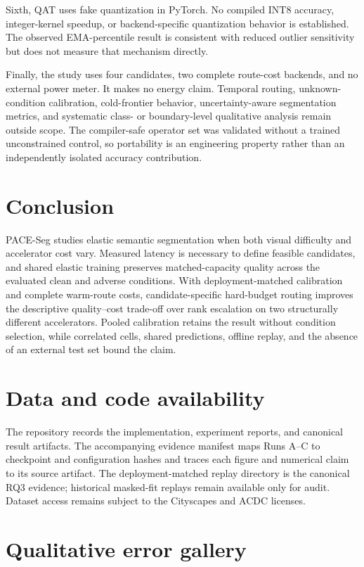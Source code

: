 \documentclass[a4paper,review,12pt]{elsarticle}
\newcommand{\method}{PACE-Seg}
\begin{document}
Sixth, QAT uses fake quantization in PyTorch. No compiled INT8 accuracy, integer-kernel speedup, or backend-specific quantization behavior is established. The observed EMA-percentile result is consistent with reduced outlier sensitivity but does not measure that mechanism directly.

Finally, the study uses four candidates, two complete route-cost backends, and no external power meter. It makes no energy claim. Temporal routing, unknown-condition calibration, cold-frontier behavior, uncertainty-aware segmentation metrics, and systematic class- or boundary-level qualitative analysis remain outside scope. The compiler-safe operator set was validated without a trained unconstrained control, so portability is an engineering property rather than an independently isolated accuracy contribution.

\section{Conclusion}
\label{sec:conclusion}

\method{} studies elastic semantic segmentation when both visual difficulty and accelerator cost vary. Measured latency is necessary to define feasible candidates, and shared elastic training preserves matched-capacity quality across the evaluated clean and adverse conditions. With deployment-matched calibration and complete warm-route costs, candidate-specific hard-budget routing improves the descriptive quality--cost trade-off over rank escalation on two structurally different accelerators. Pooled calibration retains the result without condition selection, while correlated cells, shared predictions, offline replay, and the absence of an external test set bound the claim.

\section*{Data and code availability}

The repository records the implementation, experiment reports, and canonical result artifacts. The accompanying evidence manifest maps Runs A--C to checkpoint and configuration hashes and traces each figure and numerical claim to its source artifact. The deployment-matched replay directory is the canonical RQ3 evidence; historical masked-fit replays remain available only for audit. Dataset access remains subject to the Cityscapes and ACDC licenses.

\appendix
\section{Qualitative error gallery}
\end{document}
